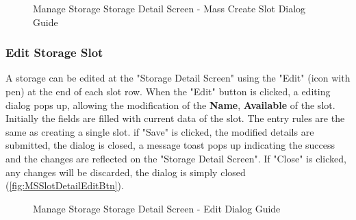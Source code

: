 \begin{figure}[htb!]
    \vspace{10pt}
    \caption{Manage Storage Storage Detail Screen - Mass Create Slot Dialog Guide}
	\label{fig:MSobjmassCreateSlotGuide}
\end{figure}


\subsubsection{Edit Storage Slot}
\label{subsubsec:editSlot}
A storage can be edited at the "Storage Detail Screen" using the "Edit" (icon with pen) at the end of each slot row. 
When the "Edit" button is clicked, a editing dialog pops up, allowing the modification of the \textbf{Name}, \textbf{Available} of the slot. Initially the fields are filled with current data of the slot. The entry rules are the same as creating a single slot.
if "Save" is clicked, the modified details are submitted, the dialog is closed, a message toast pops up indicating the success and the changes are reflected on the "Storage Detail Screen". If "Close" is clicked, any changes will be discarded, the dialog is simply closed (\autoref{fig:MSSlotDetailEditBtn}).

\begin{figure}[htb!]
	\centering
    \vspace{5pt}
    \hspace{5pt}
    \caption{Manage Storage Storage Detail Screen - Edit Dialog Guide}
	\label{fig:MSSlotDetailEditBtn}
\end{figure}

